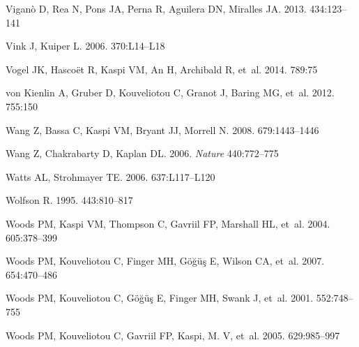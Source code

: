 \documentclass[letterpaper]{ar-1col}
\begin{document}
\begin{thebibliography}{}
{Vigan{\`o}} D, {Rea} N, {Pons} JA, {Perna} R, {Aguilera} DN, {Miralles} JA.
  2013.
\textit{\mnras} 434:123--141

{Vink} J, {Kuiper} L. 2006.
\textit{\mnras} 370:L14--L18

{Vogel} JK, {Hasco{\"e}t} R, {Kaspi} VM, {An} H, {Archibald} R, et~al. 2014.
\textit{\apj} 789:75

{von Kienlin} A, {Gruber} D, {Kouveliotou} C, {Granot} J, {Baring} MG, et~al.
  2012.
\textit{\apj} 755:150

{Wang} Z, {Bassa} C, {Kaspi} VM, {Bryant} JJ, {Morrell} N. 2008.
\textit{\apj} 679:1443--1446

{Wang} Z, {Chakrabarty} D, {Kaplan} DL. 2006.
\textit{Nature} 440:772--775

{Watts} AL, {Strohmayer} TE. 2006.
\textit{\apjl} 637:L117--L120

{Wolfson} R. 1995.
\textit{\apj} 443:810--817

{Woods} PM, {Kaspi} VM, {Thompson} C, {Gavriil} FP, {Marshall} HL, et~al. 2004.
\textit{\apj} 605:378--399

{Woods} PM, {Kouveliotou} C, {Finger} MH, {G{\"o}{\u g}{\"u}{\c s}} E, {Wilson}
  CA, et~al. 2007.
\textit{\apj} 654:470--486

{Woods} PM, {Kouveliotou} C, {G{\" o}{\u g}{\" u}{\c s}} E, {Finger} MH,
  {Swank} J, et~al. 2001.
\textit{\apj} 552:748--755

{Woods} PM, {Kouveliotou} C, {Gavriil} FP, {Kaspi}, M. V, et~al. 2005.
\textit{\apj} 629:985--997


\end{thebibliography}
\end{document}
